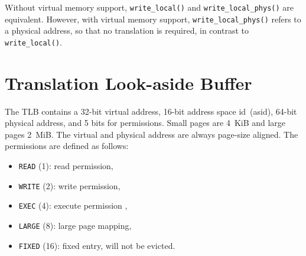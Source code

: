 Without virtual memory support, \texttt{write\_local()} and \texttt{write\_local\_phys()} are
equivalent. However, with virtual memory support, \texttt{write\_local\_phys()} refers to a physical
address, so that no translation is required, in contrast to \texttt{write\_local()}.

\section{Translation Look-aside Buffer}
\label{sec:tlb}

The TLB contains a 32-bit virtual address, 16-bit address space id~(asid), 64-bit physical address,
and 5 bits for permissions. Small pages are 4~KiB and large pages 2~MiB. The virtual and physical
address are always page-size aligned. The permissions are defined as follows:

\begin{itemize}
  \item \texttt{READ} (1): read permission,
  \item \texttt{WRITE} (2): write permission,
  \item \texttt{EXEC} (4): execute permission ,
  \item \texttt{LARGE} (8): large page mapping,
  \item \texttt{FIXED} (16): fixed entry, will not be evicted.
\end{itemize}
\extend{}
